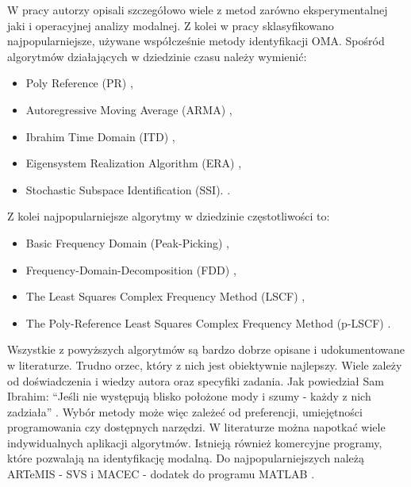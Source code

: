 W pracy \cite{Maia1997} autorzy opisali szczegółowo wiele z metod zarówno eksperymentalnej jaki i operacyjnej analizy modalnej. Z kolei w pracy \cite{Brincker2015} sklasyfikowano najpopularniejsze, używane współcześnie metody identyfikacji OMA. Spośród algorytmów działających w dziedzinie czasu należy wymienić:
\begin{itemize}
	\item Poly Reference (PR) \parencite{Norton2009,Vold1982},
	\item Autoregressive Moving Average (ARMA) \parencite{Shi1987,Huang2000,Giorcelli1994},
	\item Ibrahim Time Domain (ITD) \parencite{Ibrahim1983,Pappa1985a},
	\item Eigensystem Realization Algorithm (ERA) \parencite{Juang1985,Pappa1985,Juang1986a},
	\item Stochastic Subspace Identification (SSI). \parencite{VanOverschee1996,Peeters1999a,Peeters2000}. 
\end{itemize}
Z kolei najpopularniejsze algorytmy w dziedzinie częstotliwości to:
\begin{itemize}
	\item Basic Frequency Domain (Peak-Picking) \parencite{Felber1994},
	\item Frequency-Domain-Decomposition (FDD) \parencite{Brincker2000,Brincker2001a,Brincker2001b},
	\item The Least Squares Complex Frequency Method (LSCF) \parencite{Verboven2005},
	\item The Poly-Reference Least Squares Complex Frequency Method (p-LSCF) \parencite{Peeters2005}.
\end{itemize}



Wszystkie z powyższych algorytmów są bardzo dobrze opisane i udokumentowane w literaturze. Trudno orzec, który z nich jest obiektywnie najlepszy. Wiele zależy od doświadczenia i wiedzy autora oraz specyfiki zadania. Jak powiedział Sam Ibrahim: \enquote{Jeśli nie występują blisko położone mody i szumy - każdy z nich zadziała} . Wybór metody może więc zależeć od preferencji, umiejętności programowania czy dostępnych narzędzi. W literaturze można napotkać wiele indywidualnych aplikacji algorytmów. Istnieją również komercyjne programy, które pozwalają na identyfikację modalną. Do najpopularniejszych należą ARTeMIS - SVS \parencite{Extractor1999} i MACEC - dodatek do programu MATLAB \parencite{Reynders2014}.


